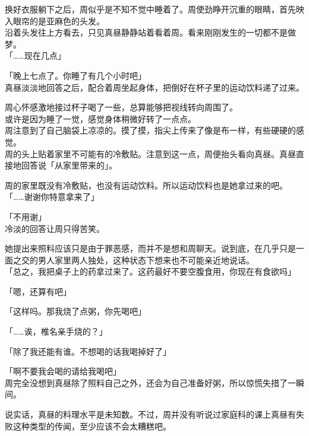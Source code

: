 \vspace{2\baselineskip}

换好衣服躺下之后，周似乎是不知不觉中睡着了。周使劲睁开沉重的眼睛，首先映入眼帘的是亚麻色的头发。\\

沿着头发往上方看去，只见真昼静静站着看着周。看来刚刚发生的一切都不是做梦。\\

「……现在几点」

「晚上七点了。你睡了有几个小时吧」\\

真昼淡淡地回答之后，配合着周坐起身体，把倒好在杯子里的运动饮料递了过来。

周心怀感激地接过杯子喝了一些，总算能够把视线转向周围了。\\

或许是因为睡了一觉，感觉身体稍微好转了一点点。\\

周注意到了自己脑袋上凉凉的。摸了摸，指尖上传来了像是布一样，有些硬硬的感觉。\\

周的头上贴着家里不可能有的冷敷贴。注意到这一点，周便抬头看向真昼。真昼直接地回答说「从家里带来的」。

周的家里既没有冷敷贴，也没有运动饮料。所以运动饮料也是她拿过来的吧。\\

「……谢谢你特意拿来了」

「不用谢」\\

冷淡的回答让周只得苦笑。

她提出来照料应该只是由于罪恶感，而并不是想和周聊天。说到底，在几乎只是一面之交的男人家里两人独处，这种状态下想来也不可能亲近地说话。\\

「总之，我把桌子上的药拿过来了。这药最好不要空腹食用，你现在有食欲吗」

「嗯，还算有吧」

「这样吗。那我烧了点粥，你先喝吧」

「……诶，椎名亲手烧的？」

「除了我还能有谁。不想喝的话我喝掉好了」

「啊不要我会喝的请给我喝吧」\\

周完全没想到真昼除了照料自己之外，还会为自己准备好粥，所以惊慌失措了一瞬间。

说实话，真昼的料理水平是未知数。不过，周并没有听说过家庭科的课上真昼有失败这种类型的传闻，至少应该不会太糟糕吧。\\

